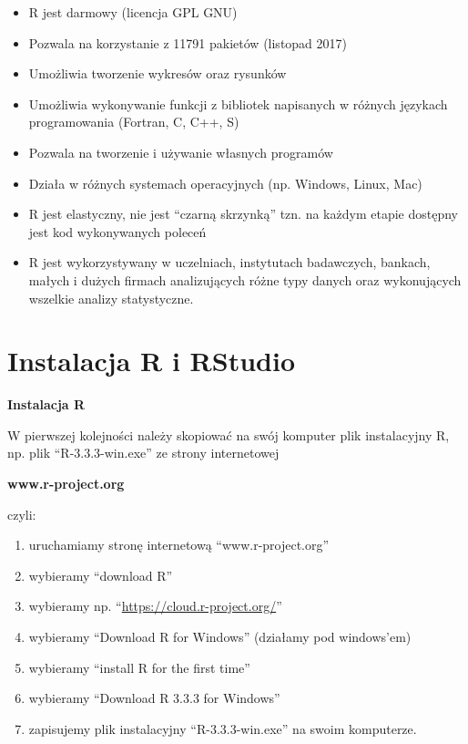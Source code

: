 \documentclass[12pt,B5paper,]{book}
\providecommand{\tightlist}{%
  \setlength{\itemsep}{0pt}\setlength{\parskip}{0pt}}
\begin{document}
\begin{itemize}
\tightlist
\item
  R jest darmowy (licencja GPL GNU)
\item
  Pozwala na korzystanie z 11791 pakietów (listopad 2017)
\item
  Umożliwia tworzenie wykresów oraz rysunków
\item
  Umożliwia wykonywanie funkcji z bibliotek napisanych w różnych
  językach programowania (Fortran, C, C++, S)
\item
  Pozwala na tworzenie i używanie własnych programów
\item
  Działa w różnych systemach operacyjnych (np. Windows, Linux, Mac)
\item
  R jest elastyczny, nie jest ``czarną skrzynką'' tzn. na każdym etapie
  dostępny jest kod wykonywanych poleceń
\item
  R jest wykorzystywany w uczelniach, instytutach badawczych, bankach,
  małych i dużych firmach analizujących różne typy danych oraz
  wykonujących wszelkie analizy statystyczne.
\end{itemize}

\section{Instalacja R i RStudio}\label{instalacja-r-i-rstudio}

\textbf{Instalacja R}

W pierwszej kolejności należy skopiować na swój komputer plik
instalacyjny R, np. plik ``R-3.3.3-win.exe'' ze strony internetowej

\begin{center}
{\bf www.r-project.org }
\end{center}

czyli:

\begin{enumerate}
\def\labelenumi{\arabic{enumi}.}
\tightlist
\item
  uruchamiamy stronę internetową ``www.r-project.org''
\item
  wybieramy ``download R''
\item
  wybieramy np. ``\url{https://cloud.r-project.org/}''
\item
  wybieramy ``Download R for Windows'' (działamy pod windows'em)
\item
  wybieramy ``install R for the first time''
\item
  wybieramy ``Download R 3.3.3 for Windows''
\item
  zapisujemy plik instalacyjny ``R-3.3.3-win.exe'' na swoim komputerze.
\end{enumerate}
\end{document}
